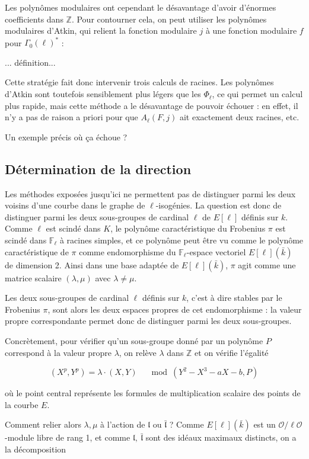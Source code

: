 \documentclass[11pt,a4paper]{article}
\newcommand{\Z}{\mathbb{Z}}
\newcommand{\F}{\mathbb{F}}
\renewcommand{\O}{\mathcal{O}}
\renewcommand{\frak}{\mathfrak}
\theoremstyle{definition}
\begin{document}
Les polynômes modulaires ont cependant le désavantage d'avoir d'énormes coefficients dans $\Z$. Pour contourner cela, on peut utiliser les polynômes modulaires d'Atkin, qui relient la fonction modulaire $j$ à une fonction modulaire $f$ pour $\Gamma_0(\ell)^*$ :

... définition...

Cette stratégie fait donc intervenir trois calculs de racines. Les polynômes d'Atkin sont toutefois sensiblement plus légers que les $\Phi_\ell$, ce qui permet un calcul plus rapide, mais cette méthode a le désavantage de pouvoir échouer : en effet, il n'y a pas de raison a priori pour que $A_\ell(F,j)$ ait exactement deux racines, etc.

Un exemple précis où ça échoue ?


\subsection{Détermination de la direction}



Les méthodes exposées jusqu'ici ne permettent pas de distinguer parmi les deux voisins d'une courbe dans le graphe de $\ell$-isogénies. La question est donc de distinguer parmi les deux sous-groupes de cardinal $\ell$ de $E[\ell]$ définis sur $k$. Comme $\ell$ est scindé dans $K$, le polynôme caractéristique du Frobenius $\pi$ est scindé dans $\F_\ell$ à racines simples, et ce polynôme peut être vu comme le polynôme caractéristique de $\pi$ comme endomorphisme du $\F_\ell$-espace vectoriel $E[\ell](\bar{k})$ de dimension 2. Ainsi dans une base adaptée de $E[\ell](\bar{k})$, $\pi$ agit comme une matrice scalaire $(\lambda,\mu)$ avec $\lambda\neq\mu$.

Les deux sous-groupes de cardinal $\ell$ définis sur $k$, c'est à dire stables par le Frobenius $\pi$, sont alors les deux espaces propres de cet endomorphisme : la valeur propre correspondante permet donc de distinguer parmi les deux sous-groupes.

Concrètement, pour vérifier qu'un sous-groupe donné par un polynôme $P$ correspond à la valeur propre $\lambda$, on relève $\lambda$ dans $\Z$ et on vérifie l'égalité

$$ (X^p,Y^p)=\lambda\cdot (X,Y)\quad \mod (Y^2-X^3-aX-b, P)$$

où le point central représente les formules de multiplication scalaire des points de la courbe $E$.

Comment relier alors $\lambda,\mu$ à l'action de $\frak l$ ou $\bar{\frak l}$ ?
Comme $E[\ell](\bar{k})$ est un $\O/\ell\O$-module libre de rang 1, et comme $\frak l,\ \bar{\frak l}$ sont des idéaux maximaux distincts, on a la décomposition
\end{document}
